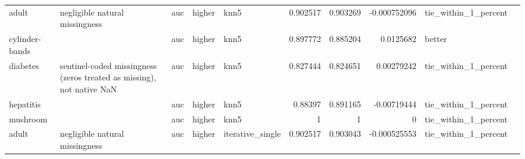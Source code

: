 \begin{table}[ht]
{\begin{tabular}{lllllrrrll}
 adult          & negligible natural missingness                                        & auc                            & higher             & knn5             &                   0.902517 &               0.903269 &                    -0.000752096 & tie\_within\_1\_percent &                                                                                                                    \\
 cylinder-bands &                                                                       & auc                            & higher             & knn5             &                   0.897772 &               0.885204 &                     0.0125682   & better               &                                                                                                                    \\
 diabetes       & sentinel-coded missingness (zeros treated as missing), not native NaN & auc                            & higher             & knn5             &                   0.827444 &               0.824651 &                     0.00279242  & tie\_within\_1\_percent &                                                                                                                    \\
 hepatitis      &                                                                       & auc                            & higher             & knn5             &                   0.88397  &               0.891165 &                    -0.00719444  & tie\_within\_1\_percent &                                                                                                                    \\
 mushroom       &                                                                       & auc                            & higher             & knn5             &                   1        &               1        &                     0           & tie\_within\_1\_percent &                                                                                                                    \\
 adult          & negligible natural missingness                                        & auc                            & higher             & iterative\_single &                   0.902517 &               0.903043 &                    -0.000525553 & tie\_within\_1\_percent &                                                                                                                    \\

\end{tabular}}
\end{table}
